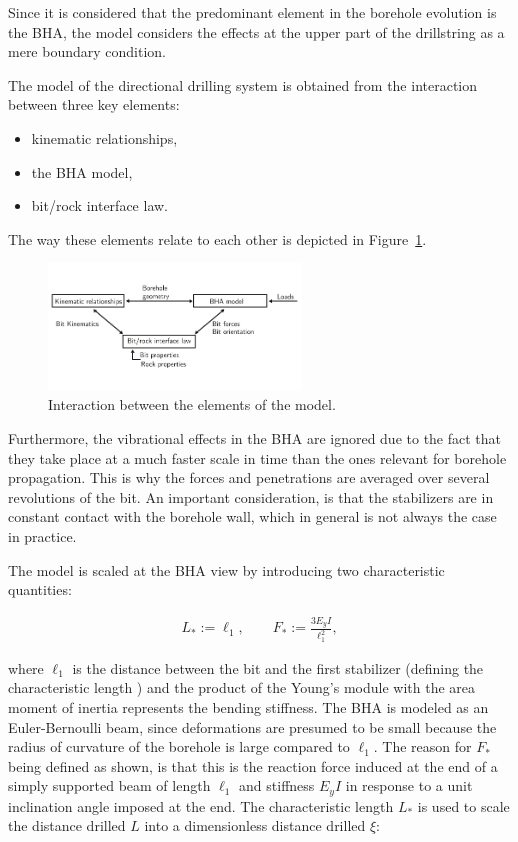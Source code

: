 Since it is considered that the predominant element in the borehole evolution is the BHA, the model considers the effects at the upper part of the drillstring as a mere boundary condition.

The model of the directional drilling system is obtained from the interaction between three key elements: 

\begin{itemize}
	\item kinematic relationships,
	\item the BHA model,
	\item bit/rock interface law.
\end{itemize}

The way these elements relate to each other is depicted in Figure~\ref{fig:modelinter}.

\begin{figure}[ht]\centering
	\includegraphics[width=0.6\textwidth]{img/modelinteraction.pdf}
	\caption{\label{fig:modelinter}Interaction between the elements of the model.}
\end{figure}

Furthermore, the vibrational effects in the BHA are ignored due to the fact that they take place at a much faster scale in time than the ones relevant for borehole propagation. This is why the forces and penetrations are averaged over several revolutions of the bit. An important consideration, is that the stabilizers are in constant  contact with the borehole wall, which in general is not always the case in practice. 

 The model is scaled at the BHA view by introducing two characteristic quantities:

\begin{align}
	L_* := \ell_1, \qquad F_* := \frac{3 E_y I}{\ell_1^2},
\end{align}

where $\ell_1$ is the distance between the bit and the first stabilizer (defining the characteristic length ) and the product of the Young's module  with the area moment of inertia  represents the bending stiffness. The BHA is modeled as an Euler-Bernoulli beam, since deformations are presumed to be small because the radius of curvature of the borehole is large compared to $\ell_1$. The reason for $F_*$ being defined as shown, is that this is the reaction force induced at the end of a simply supported beam of length $\ell_1$ and stiffness $E_yI$ in response to a unit inclination angle imposed at the end. The characteristic length $L_*$ is used to scale the distance drilled $L$ into a dimensionless distance drilled $\xi$:

